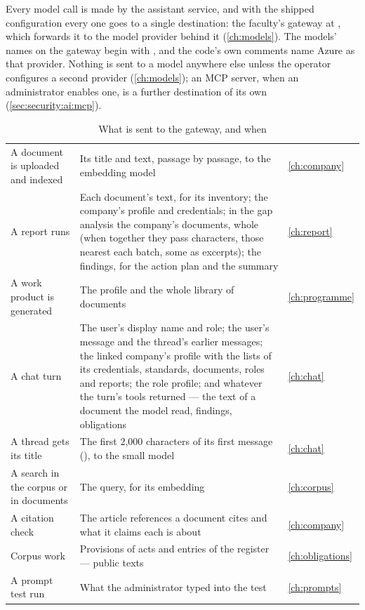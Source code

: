 Every model call is made by the assistant service, and with the shipped configuration every
one goes to a single destination: the faculty's gateway at , which
forwards it to the model provider behind it (\cref{ch:models}). The models' names on the
gateway begin with , and the code's own comments name Azure as that provider.
Nothing is sent to a model anywhere else unless the operator configures a second provider
(\cref{ch:models}); an MCP server, when an administrator enables one, is a further
destination of its own (\cref{sec:security:ai:mcp}).

\begin{table}[H]
\caption{What is sent to the gateway, and when}\label{tab:security:leaves}
\begin{tabularx}{\textwidth}{@{}L{43mm}Yl@{}}
\toprule
{} &  &  \\
\midrule
A document is uploaded and indexed & Its title and text, passage by passage, to the embedding model & \cref{ch:company} \\
A report runs & Each document's text, for its inventory; the company's profile and credentials; in the gap analysis the company's documents, whole (when together they pass  \code{=}  characters, those nearest each batch, some as excerpts); the findings, for the action plan and the summary & \cref{ch:report} \\
A work product is generated & The profile and the whole library of documents & \cref{ch:programme} \\
A chat turn & The user's display name and role; the user's message and the thread's earlier messages; the linked company's profile with the lists of its credentials, standards, documents, roles and reports; the role profile; and whatever the turn's tools returned --- the text of a document the model read, findings, obligations & \cref{ch:chat} \\
A thread gets its title & The first 2,000 characters of its first message (), to the small model & \cref{ch:chat} \\
A search in the corpus or in documents & The query, for its embedding & \cref{ch:corpus} \\
A citation check & The article references a document cites and what it claims each is about & \cref{ch:company} \\
Corpus work & Provisions of acts and entries of the register --- public texts & \cref{ch:obligations} \\
A prompt test run & What the administrator typed into the test & \cref{ch:prompts} \\
\bottomrule
\end{tabularx}
\end{table}


